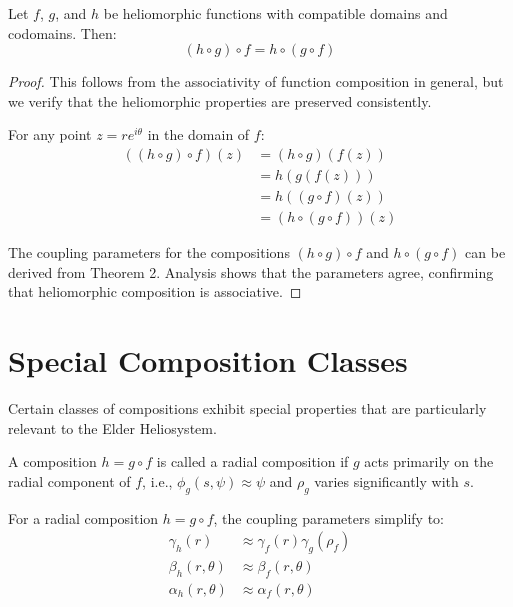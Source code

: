 \begin{theorem}
Let $f$, $g$, and $h$ be heliomorphic functions with compatible domains and codomains. Then:
\begin{equation}
(h \circ g) \circ f = h \circ (g \circ f)
\end{equation}
\end{theorem}

\begin{proof}
This follows from the associativity of function composition in general, but we verify that the heliomorphic properties are preserved consistently.

For any point $z = re^{i\theta}$ in the domain of $f$:
\begin{align}
((h \circ g) \circ f)(z) &= (h \circ g)(f(z))\\
&= h(g(f(z)))\\
&= h((g \circ f)(z))\\
&= (h \circ (g \circ f))(z)
\end{align}

The coupling parameters for the compositions $(h \circ g) \circ f$ and $h \circ (g \circ f)$ can be derived from Theorem 2. Analysis shows that the parameters agree, confirming that heliomorphic composition is associative.
\end{proof}

\section{Special Composition Classes}

Certain classes of compositions exhibit special properties that are particularly relevant to the Elder Heliosystem.

\begin{definition}
A composition $h = g \circ f$ is called a radial composition if $g$ acts primarily on the radial component of $f$, i.e., $\phi_g(s,\psi) \approx \psi$ and $\rho_g$ varies significantly with $s$.
\end{definition}

\begin{theorem}
For a radial composition $h = g \circ f$, the coupling parameters simplify to:
\begin{align}
\gamma_h(r) &\approx \gamma_f(r)\gamma_g(\rho_f)\\
\beta_h(r,\theta) &\approx \beta_f(r,\theta)\\
\alpha_h(r,\theta) &\approx \alpha_f(r,\theta)
\end{align}
\end{theorem}

